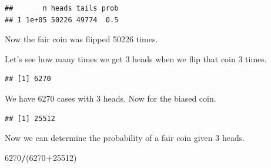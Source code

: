 \documentclass[
]{book}
\newenvironment{Shaded}{\begin{snugshade}}{\end{snugshade}}
\newcommand{\DataTypeTok}[1]{\textcolor[rgb]{0.13,0.29,0.53}{#1}}
\newcommand{\DecValTok}[1]{\textcolor[rgb]{0.00,0.00,0.81}{#1}}
\newcommand{\FloatTok}[1]{\textcolor[rgb]{0.00,0.00,0.81}{#1}}
\newcommand{\KeywordTok}[1]{\textcolor[rgb]{0.13,0.29,0.53}{\textbf{#1}}}
\newcommand{\NormalTok}[1]{#1}
\newcommand{\OperatorTok}[1]{\textcolor[rgb]{0.81,0.36,0.00}{\textbf{#1}}}
\newcommand{\StringTok}[1]{\textcolor[rgb]{0.31,0.60,0.02}{#1}}
\begin{document}
\begin{verbatim}
##       n heads tails prob
## 1 1e+05 50226 49774  0.5
\end{verbatim}

Now the fair coin was flipped 50226 times.

Let's see how many times we get 3 heads when we flip that coin 3 times.

\begin{Shaded}
\end{Shaded}

\begin{verbatim}
## [1] 6270
\end{verbatim}

We have 6270 cases with 3 heads. Now for the biased coin.

\begin{Shaded}
\end{Shaded}

\begin{verbatim}
## [1] 25512
\end{verbatim}

Now we can determine the probability of a fair coin given 3 heads.

\begin{Shaded}
\begin{Highlighting}[]
\DecValTok{6270}\OperatorTok{/}\NormalTok{(}\DecValTok{6270}\OperatorTok{+}\DecValTok{25512}\NormalTok{)}
\end{Highlighting}
\end{Shaded}
\end{document}
